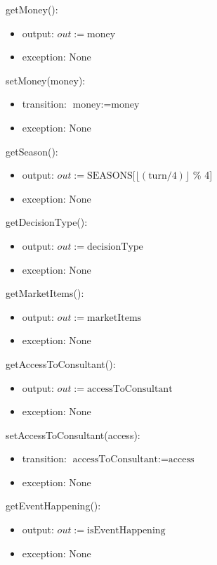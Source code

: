 \documentclass[12pt, titlepage]{article}
\begin{document}
\noindent getMoney():
\begin{itemize}
\item output: $out := \text{money}$
\item exception: None
\end{itemize}


\noindent setMoney(money):
\begin{itemize}
\item transition: $\text{money} := \text{money}$
\item exception: None
\end{itemize}

\noindent getSeason():
\begin{itemize}
\item output: $out := \text{SEASONS}[\lfloor(\text{turn} / 4)\rfloor$ \% 4]
\item exception: None
\end{itemize}

\noindent getDecisionType():
\begin{itemize}
\item output: $out := \text{decisionType}$
\item exception: None
\end{itemize}

\noindent getMarketItems():
\begin{itemize}
\item output: $out := \text{marketItems}$
\item exception: None
\end{itemize}

\noindent getAccessToConsultant():
\begin{itemize}
\item output: $out := \text{accessToConsultant}$
\item exception: None
\end{itemize}

\noindent setAccessToConsultant(access):
\begin{itemize}
\item transition: $\text{accessToConsultant} := \text{access}$
\item exception: None
\end{itemize}

\noindent getEventHappening():
\begin{itemize}
\item output: $out := \text{isEventHappening}$
\item exception: None
\end{itemize}
\end{document}
